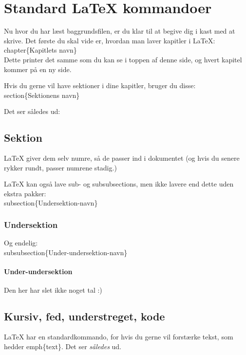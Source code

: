 \chapter{Standard LaTeX kommandoer}
Nu hvor du har læst baggrundsfilen, er du klar til at begive dig i kast med at skrive. Det første du skal vide er, hvordan man laver kapitler i LaTeX:\\ 

\bs chapter\{Kapitlets navn\}\\

\noindent %
Dette printer det samme som du kan se i toppen af denne side, og hvert kapitel kommer på en ny side.

\noindent
Hvis du gerne vil have sektioner i dine kapitler, bruger du disse:\\

\bs section\{Sektionens navn\}

\noindent
Det ser således ud:

\section{Sektion}
LaTeX giver dem selv numre, så de passer ind i dokumentet (og hvis du senere rykker rundt, passer numrene stadig.)

\noindent
LaTeX kan også lave sub- og subsubsections, men ikke lavere end dette uden ekstra pakker:\\

\bs subsection\{Undersektion-navn\}

\subsection{Undersektion}
Og endelig:\\

\bs subsubsection\{Under-undersektion-navn\}

\subsubsection{Under-undersektion}
Den her har slet ikke noget tal :)

\section{Kursiv, fed, understreget, kode}
LaTeX har en standardkommando, for hvis du gerne vil forstærke tekst, som hedder \bs emph\{text\}. Det ser \emph{således} ud.

